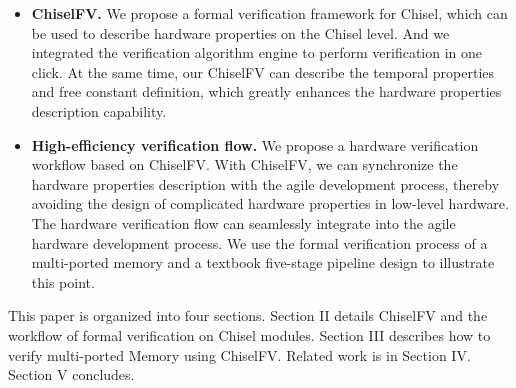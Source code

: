 \documentclass[conference]{IEEEtran}
\theoremstyle{definition}
\begin{document}
\begin{itemize}
    \item \textbf{ChiselFV.} We propose a formal verification framework for Chisel, which can be used to describe hardware properties on the Chisel level. And we integrated the verification algorithm engine to perform verification in one click. At the same time, our ChiselFV can describe the temporal properties and free constant definition, which greatly enhances the hardware properties description capability.
    \item \textbf{High-efficiency verification flow.} We propose a hardware verification workflow based on ChiselFV. With ChiselFV, we can synchronize the hardware properties description with the agile development process, thereby avoiding the design of complicated hardware properties in low-level hardware. The hardware verification flow can seamlessly integrate into the agile hardware development process. 
    We use the formal verification process of a multi-ported memory and a textbook five-stage pipeline design to illustrate this point.
\end{itemize}

This paper is organized into four sections. 
Section II details ChiselFV and the workflow of formal verification on Chisel modules. Section III describes how to verify multi-ported Memory using ChiselFV. Related work is in Section IV. Section V concludes.



\end{document}
